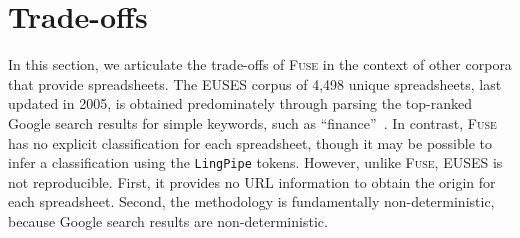 \documentclass[conference]{IEEEtran}
\begin{document}




\section{Trade-offs}
\label{sec:trade-offs}

In this section, we articulate the trade-offs of \textsc{Fuse} in the context of other corpora that provide spreadsheets. The EUSES corpus of 4,498 unique spreadsheets, last updated in 2005, is obtained predominately through parsing the top-ranked Google search results for simple keywords, such as ``finance''~\cite{Fisher2005}. In contrast, \textsc{Fuse} has no explicit classification for each spreadsheet, though it may be possible to infer a classification using the \texttt{LingPipe} tokens. However, unlike \textsc{Fuse}, EUSES is not reproducible. First, it provides no URL information to obtain the origin for each spreadsheet. Second, the methodology is fundamentally non-deterministic, because Google search results are non-deterministic.
\end{document}
